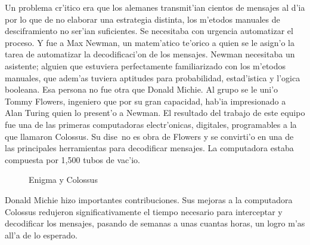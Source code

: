 \documentclass[11pt]{article}
\begin{document}
Un problema cr'itico era que los alemanes transmit'ian cientos de mensajes al d'ia por lo que de no elaborar una estrategia distinta, los m'etodos manuales de desciframiento no ser'ian suficientes. Se necesitaba con urgencia automatizar el proceso. Y fue a Max Newman, un matem'atico te'orico a quien se le asign'o la tarea de automatizar la decodificaci'on de los mensajes. Newman necesitaba un asistente; alguien que estuviera perfectamente familiarizado con los m'etodos manuales, que adem'as tuviera aptitudes para probabilidad, estad'istica y l'ogica booleana. Esa persona no fue otra que Donald Michie. Al grupo se le uni'o Tommy Flowers, ingeniero que por su gran capacidad, hab'ia impresionado a Alan Turing quien lo present'o a Newman. El resultado del trabajo de este equipo fue una de las primeras computadoras electr'onicas, digitales, programables a la que llamaron Colossus. Su dise~no es obra de Flowers y se convirti'o en una de las principales herramientas para decodificar mensajes. La computadora estaba compuesta por 1,500 tubos de vac'io. 



\begin{figure}[h]
\begin{center}

\caption{Enigma y Colossus}
  \label{fig:enigmacolossus}
\end{center}
\end{figure} 

Donald Michie hizo importantes contribuciones. Sus mejoras a la computadora Colossus redujeron significativamente el tiempo necesario para interceptar y decodificar los mensajes, pasando de semanas a unas cuantas horas, un logro m'as all'a de lo esperado.
\end{document}
